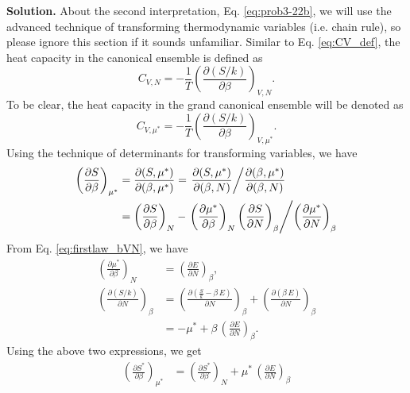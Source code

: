 \documentclass[twocolumn, 10pt]{article}
\numberwithin{equation}{section}
\newenvironment{solution}
{\par\medskip
  \textbf{Solution. }\ignorespaces}
{\medskip}
\begin{document}
\begin{solution}
About the second interpretation, Eq. \eqref{eq:prob3-22b},
we will use the advanced technique of transforming thermodynamic variables
(i.e. chain rule),
so please ignore this section if it sounds unfamiliar.
%
Similar to Eq. \eqref{eq:CV_def},
the heat capacity in the canonical ensemble is defined as
\begin{equation}
  C_{V, N}
  = -\frac{1}{T} \left( \frac{ \partial (S/k) } { \partial \beta } \right)_{V, N}
  .
  \label{eq:CVN_def}
\end{equation}
%
To be clear, the heat capacity in the grand canonical ensemble
will be denoted as
\begin{equation}
  C_{V, \mu^*}
  = -\frac{1}{T} \left( \frac{ \partial (S/k) } { \partial \beta } \right)_{V, \mu^*}
  .
  \label{eq:CVmu_def}
\end{equation}
%
Using the technique of determinants for transforming variables, we have
\begin{align*}
  \left( \frac{ \partial S } {\partial \beta } \right)_{\mu^*}
  &=
  \frac{ \partial (S, \mu^*) } { \partial (\beta, \mu^*) }
  =
  \left.
  \frac{ \partial (S, \mu^*) } { \partial (\beta, N) }
  \middle/
  \frac{ \partial (\beta, \mu^*) } { \partial (\beta, N) }
  \right.
  \\
  &=
  \left( \frac{ \partial S } {\partial \beta } \right)_{N}
  -
  \left.
  \left( \frac{ \partial \mu^* } {\partial \beta } \right)_{N}
  \left( \frac{ \partial S } {\partial N } \right)_{\beta}
  \middle/
  \left( \frac{ \partial \mu^* } {\partial N } \right)_{\beta}
  \right.
\end{align*}
From Eq. \eqref{eq:firstlaw_bVN}, we have
\begin{align*}
  \left( \frac{ \partial \mu^* } {\partial \beta } \right)_{N}
  &=
  \left( \frac{ \partial E } {\partial N } \right)_{\beta}
  ,
  \\
  \left( \frac{ \partial (S/k) } {\partial N } \right)_{\beta}
  &=
  \left( \frac{ \partial (\frac{S}{k} - \beta \, E) } {\partial N } \right)_{\beta}
  +
  \left( \frac{ \partial ( \beta \,  E) } {\partial N } \right)_{\beta}
  \\
  &=
  -\mu^*
  +
  \beta \, \left( \frac{ \partial E } {\partial N } \right)_{\beta}
  .
\end{align*}
Using the above two expressions, we get
\begin{align*}
  \left( \frac{ \partial S^* } {\partial \beta } \right)_{\mu^*}
  &=
  \left( \frac{ \partial S^* } {\partial \beta } \right)_{N}
  +
  \mu^* \,
  \left( \frac{ \partial E } {\partial N } \right)_{\beta}

\end{align*}
\end{solution}
\end{document}
